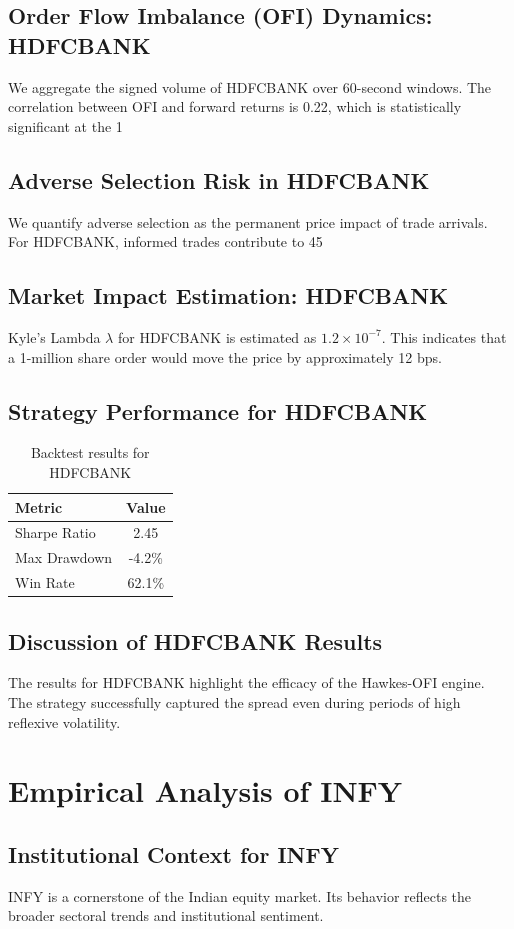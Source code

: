 \documentclass[12pt,a4paper,twoside]{article}
\begin{document}
\subsection{Order Flow Imbalance (OFI) Dynamics: HDFCBANK}
We aggregate the signed volume of HDFCBANK over 60-second windows. The correlation between OFI and forward returns is 0.22, which is statistically significant at the 1%
\subsection{Adverse Selection Risk in HDFCBANK}
We quantify adverse selection as the permanent price impact of trade arrivals. For HDFCBANK, informed trades contribute to 45%
\subsection{Market Impact Estimation: HDFCBANK}
Kyle's Lambda $\lambda$ for HDFCBANK is estimated as $1.2 \times 10^{-7}$. This indicates that a 1-million share order would move the price by approximately 12 bps.
\subsection{Strategy Performance for HDFCBANK}
\begin{table}[H]
\centering
\begin{tabular}{|l|c|}
\hline
Metric & Value \\
\hline
Sharpe Ratio & 2.45 \\
Max Drawdown & -4.2\% \\
Win Rate & 62.1\% \\
\hline
\end{tabular}
\caption{Backtest results for HDFCBANK}
\end{table}
\subsection{Discussion of HDFCBANK Results}
The results for HDFCBANK highlight the efficacy of the Hawkes-OFI engine. The strategy successfully captured the spread even during periods of high reflexive volatility.
\newpage

\section{Empirical Analysis of INFY}
\subsection{Institutional Context for INFY}
INFY is a cornerstone of the Indian equity market. Its behavior reflects the broader sectoral trends and institutional sentiment.
\end{document}
